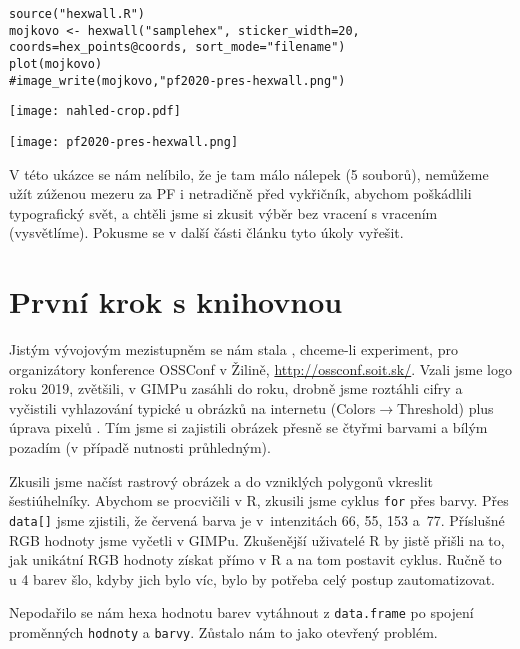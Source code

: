 \newpage
\begin{lstlisting}
source("hexwall.R")
mojkovo <- hexwall("samplehex", sticker_width=20, coords=hex_points@coords, sort_mode="filename")
plot(mojkovo)
#image_write(mojkovo,"pf2020-pres-hexwall.png")
\end{lstlisting}



\noindent
\texttt{[image: nahled-crop.pdf]}

\noindent
\texttt{[image: pf2020-pres-hexwall.png]}

V této ukázce se nám nelíbilo, že je tam málo nálepek (5 souborů), nemůžeme užít zúženou mezeru za PF i netradičně před vykřičník, abychom poškádlili typografický svět, a chtěli jsme si zkusit výběr bez vracení s vracením (vysvětlíme). Pokusme se v další části článku tyto úkoly vyřešit.

\section{První krok s knihovnou }
Jistým vývojovým mezistupněm se nám stala , chceme-li experiment, pro organizátory konference OSSConf v Žilině, \url{http://ossconf.soit.sk/}. 
Vzali jsme logo roku 2019, zvětšili, v GIMPu zasáhli do roku, drobně jsme roztáhli cifry a vyčistili vyhlazování typické u obrázků na internetu (Colors$\rightarrow$Threshold) plus úprava pixelů . Tím jsme si zajistili obrázek přesně se čtyřmi barvami a bílým pozadím (v případě nutnosti průhledným).

Zkusili jsme načíst rastrový obrázek a do vzniklých polygonů vkreslit šestiúhelníky. Abychom se procvičili v R, zkusili jsme cyklus \texttt{for} přes barvy. Přes \texttt{data[]} jsme zjistili, že červená barva je v~intenzitách 66, 55, 153 a~77. Příslušné RGB hodnoty jsme vyčetli v GIMPu. Zkušenější uživatelé R by jistě přišli na to, jak unikátní RGB hodnoty získat přímo v R a na tom postavit cyklus. Ručně to u 4 barev šlo, kdyby jich bylo víc, bylo by potřeba celý postup zautomatizovat.

Nepodařilo se nám hexa hodnotu barev vytáhnout z \texttt{data.frame} po spojení proměnných \texttt{hodnoty} a \texttt{barvy}. Zůstalo nám to jako otevřený problém.

